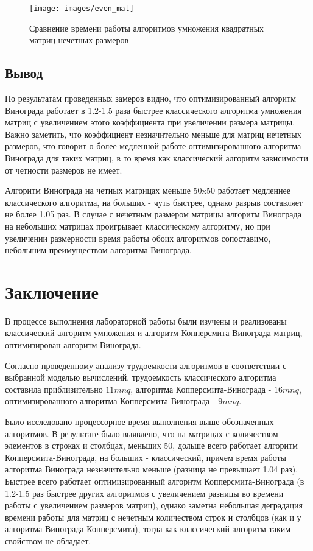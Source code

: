 \documentclass[12pt]{report}
\begin{document}
    \begin{figure}[H]
        \centering
        \texttt{[image: images/even\_mat]}
        \caption{Сравнение времени работы алгоритмов умножения квадратных матриц нечетных размеров}
        \label{fig:even_graph}
    \end{figure}


    \section{Вывод}

    По результатам проведенных замеров видно, что оптимизированный алгоритм Винограда
    работает в 1.2-1.5 раза быстрее классического алгоритма умножения матриц с увеличением этого
    коэффициента при увеличении размера матрицы.
    Важно заметить, что коэффициент незначительно меньше для матриц нечетных размеров,
    что говорит о более медленной работе оптимизированного алгоритма Винограда для таких матриц,
    в то время как классический алгоритм зависимости от четности размеров не имеет.

    Алгоритм Винограда на четных матрицах меньше 50x50 работает медленнее классического алгоритма,
    на больших - чуть быстрее, однако разрыв составляет не более 1.05 раз.
    В случае с нечетным размером матрицы алгоритм Винограда на небольших матрицах проигрывает классическому алгоритму,
    но при увеличении размерности время работы обоих алгоритмов сопоставимо,
    небольшим преимуществом алгоритма Винограда.
    \newpage

    \chapter*{Заключение}
    В процессе выполнения лабораторной работы были изучены и реализованы классический алгоритм
    умножения и алгоритм Копперсмита-Винограда матриц, оптимизирован алгоритм Винограда.

    Согласно проведенному анализу трудоемкости алгоритмов в соответствии с выбранной моделью вычислений,
    трудоемкость классического алгоритма составила приблизительно $11mnq$,
    алгоритма Копперсмита-Винограда - $16mnq$,
    оптимизированного алгоритма Копперсмита-Винограда - $9mnq$.

    Было исследовано процессорное время выполнения выше обозначенных алгоритмов.
    В результате было выявлено, что на матрицах с количеством элементов в строках и столбцах,
    меньших 50, дольше всего работает алгоритм Копперсмита-Винограда, на больших - классический,
    причем время работы алгоритма Винограда незначительно меньше (разница не превышает 1.04 раз).
    Быстрее всего работает оптимизированный алгоритм Копперсмита-Винограда
    (в 1.2-1.5 раз быстрее других алгоритмов с увеличением разницы во времени работы с увеличением размеров матриц),
    однако заметна небольшая деградация времени работы для матриц с нечетным количеством строк и столбцов
    (как и у алгоритма Винограда-Копперсмита),
    тогда как классический алгоритм таким свойством не обладает.


    \newpage

\end{document}

